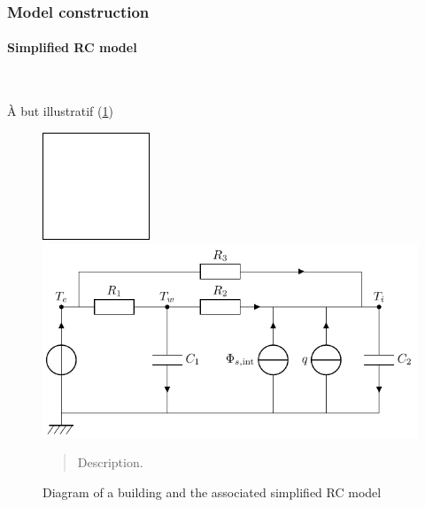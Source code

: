\documentclass[11pt]{article}
\begin{document}
        \subsubsection{Model construction} %
        \label{ssub:model_construction}

        \paragraph{Simplified RC model}\mbox{}\\ %
        \label{par:simplified_rc_model}

        À but illustratif (\ref{fig:RClight})

        \begin{figure}[ht]
            \centering
            \includegraphics[width=0.33\columnwidth]{figures/building.drawio.png}
            \includegraphics[width=0.66\columnwidth]{figures/R3C2.pdf}
            \caption{\label{fig:RClight} Diagram of a building and the associated simplified RC model}
            \begin{quote}
                \vspace{-2mm}
                \small\noindent
                Description.
            \end{quote}
         \end{figure}
\end{document}
